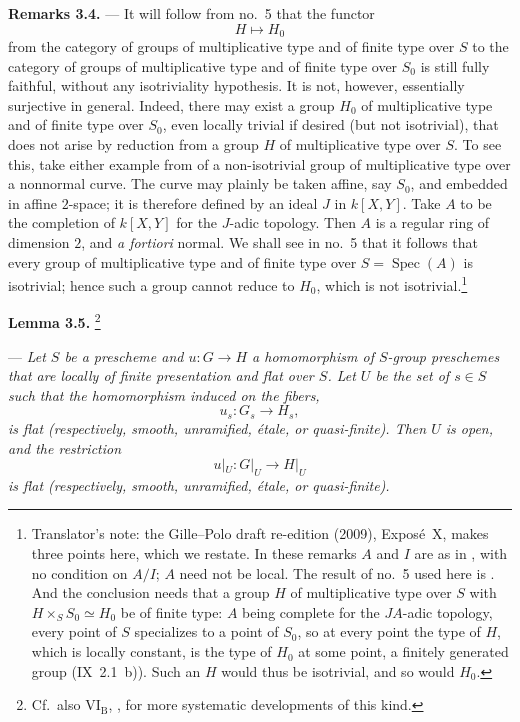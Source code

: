 \medskip
\noindent{}%
\textbf{Remarks 3.4.} ---
It will follow from no.~5 that the functor
\[
  H\longmapsto H_0
\]
from the category of groups of multiplicative type and of finite type
over \(S\) to the category of groups of multiplicative type and of
finite type over \(S_0\) is still fully faithful, without any
isotriviality hypothesis. It is not, however, essentially surjective in
general. Indeed, there may exist a group \(H_0\) of multiplicative type
and of finite type over \(S_0\), even locally trivial if desired (but
not isotrivial), that does not arise by reduction from a group \(H\) of
multiplicative type over \(S\). To see this, take either example from  of a non-isotrivial group of
multiplicative type over a nonnormal curve. The curve may plainly be
taken affine, say \(S_0\), and embedded in affine \(2\)-space; it is
therefore defined by an ideal \(J\) in \(k[X,Y]\). Take \(A\) to be
the completion of \(k[X,Y]\) for the \(J\)-adic topology. Then \(A\)
is a regular ring of dimension \(2\), and \emph{a fortiori} normal.
We shall see in no.~5 that it follows that every group of
multiplicative type and of finite type over \(S=\operatorname{Spec}(A)\)
is isotrivial; hence such a group cannot reduce to \(H_0\), which is not
isotrivial.\footnote{Translator's note: the Gille--Polo draft re-edition
(2009), Expos\'e~X, makes three points here, which we restate. In these
remarks \(A\) and \(I\) are as in , with no condition on \(A/I\);
\(A\) need not be local. The result of no.~5 used here is
. And the conclusion needs that a group \(H\) of
multiplicative type over \(S\) with \(H\times_S S_0\simeq H_0\) be of
finite type: \(A\) being complete for the \(JA\)-adic topology, every
point of \(S\) specializes to a point of \(S_0\), so at every point the
type of \(H\), which is locally constant, is the type of \(H_0\) at some
point, a finitely generated group (IX~2.1~b)). Such an \(H\) would thus
be isotrivial, and so would \(H_0\).}

\medskip
\noindent{}\textbf{Lemma 3.5.}%
\begingroup
\renewcommand{\thefootnote}{\(\ast\)}%
\footnote{Cf.\ also \(\mathrm{VI}_{\mathrm B}\), , for more
systematic developments of this kind.}%
\endgroup
\addtocounter{footnote}{-1}
---
\textit{Let \(S\) be a prescheme and
\(u:G\to H\) a homomorphism of \(S\)-group preschemes that are
locally of finite presentation and flat over \(S\). Let \(U\) be the
set of \(s\in S\) such that the homomorphism induced on the fibers,
\[
  u_s:G_s\longrightarrow H_s,
\]
is flat (respectively, smooth, unramified, étale, or quasi-finite).
Then \(U\) is open, and the restriction
\[
  u|_U:G|_U\longrightarrow H|_U
\]
is flat (respectively, smooth, unramified, étale, or quasi-finite).}

